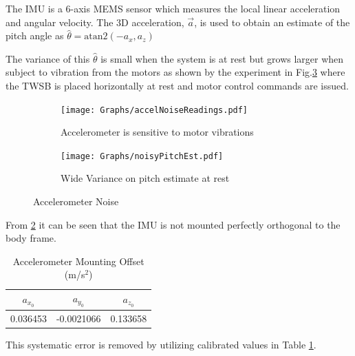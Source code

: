         The IMU is a 6-axis MEMS sensor \cite{ComplimentaryKalman} which measures the local linear acceleration 
        and angular velocity.
        The 3D acceleration, $\vec{a}$, is used to obtain an 
        estimate of the pitch angle as $\hat{\theta} = \mathrm{atan2}\left(-a_x ,a_z \right)$
       
        The variance of this $\hat{\theta}$ is small when the system is at rest but grows larger when subject to vibration from the motors
        as shown by the experiment in Fig.\ref{fig:accelNoise} where the TWSB is placed horizontally at rest and motor control commands are issued. 
        \begin{figure}[H]
            \centering
            \begin{subfigure}[b]{0.5\textwidth}

                \texttt{[image: Graphs/accelNoiseReadings.pdf]}
                \caption{Accelerometer is sensitive to motor vibrations}
                \label{fig:accelRaw}
                
            \end{subfigure}
            \hfill
            \begin{subfigure}[b]{0.45\textwidth}
                \texttt{[image: Graphs/noisyPitchEst.pdf]}
                \caption{Wide Variance on pitch estimate at rest}
                \label{fig:pitchNoise}
            \end{subfigure}
            \caption{Accelerometer Noise}   
            \label{fig:accelNoise}
        \end{figure}

        From \ref{fig:pitchNoise} it can be seen that the IMU is not mounted perfectly orthogonal to the body frame. 
        \begin{table}[H]
            \centering
            \begin{tabular}{c c c} 
                \toprule
                $a_{x_0}$ & $a_{y_0}$ & $a_{z_0}$ \\
                \midrule
                0.036453 & -0.0021066 & 0.133658 \\
                \bottomrule

            \end{tabular}
            \caption{Accelerometer Mounting Offset (m/s$^{2}$)}
            \label{tab:accelOffset}
        \end{table}
        This systematic error is removed by utilizing calibrated values in Table \ref{tab:accelOffset}.
